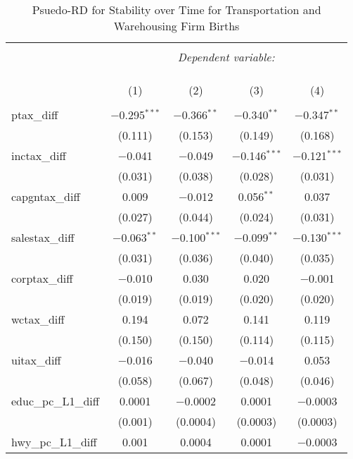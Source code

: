 
\begin{table}[!htbp] \centering 
  \caption{Psuedo-RD for Stability over Time for  Transportation and Warehousing Firm Births} 
  \label{} 
\begin{tabular}{@{\extracolsep{5pt}}lcccc} 
\\[-1.8ex]\hline 
\hline \\[-1.8ex] 
 & \multicolumn{4}{c}{\textit{Dependent variable:}} \\ 
\cline{2-5} 
\\[-1.8ex] & \multicolumn{4}{c}{ } \\ 
\\[-1.8ex] & (1) & (2) & (3) & (4)\\ 
\hline \\[-1.8ex] 
 ptax\_diff & $-$0.295$^{***}$ & $-$0.366$^{**}$ & $-$0.340$^{**}$ & $-$0.347$^{**}$ \\ 
  & (0.111) & (0.153) & (0.149) & (0.168) \\ 
  inctax\_diff & $-$0.041 & $-$0.049 & $-$0.146$^{***}$ & $-$0.121$^{***}$ \\ 
  & (0.031) & (0.038) & (0.028) & (0.031) \\ 
  capgntax\_diff & 0.009 & $-$0.012 & 0.056$^{**}$ & 0.037 \\ 
  & (0.027) & (0.044) & (0.024) & (0.031) \\ 
  salestax\_diff & $-$0.063$^{**}$ & $-$0.100$^{***}$ & $-$0.099$^{**}$ & $-$0.130$^{***}$ \\ 
  & (0.031) & (0.036) & (0.040) & (0.035) \\ 
  corptax\_diff & $-$0.010 & 0.030 & 0.020 & $-$0.001 \\ 
  & (0.019) & (0.019) & (0.020) & (0.020) \\ 
  wctax\_diff & 0.194 & 0.072 & 0.141 & 0.119 \\ 
  & (0.150) & (0.150) & (0.114) & (0.115) \\ 
  uitax\_diff & $-$0.016 & $-$0.040 & $-$0.014 & 0.053 \\ 
  & (0.058) & (0.067) & (0.048) & (0.046) \\ 
  educ\_pc\_L1\_diff & 0.0001 & $-$0.0002 & 0.0001 & $-$0.0003 \\ 
  & (0.001) & (0.0004) & (0.0003) & (0.0003) \\ 
  hwy\_pc\_L1\_diff & 0.001 & 0.0004 & 0.0001 & $-$0.0003 \\ 

\end{tabular}
\end{table}
